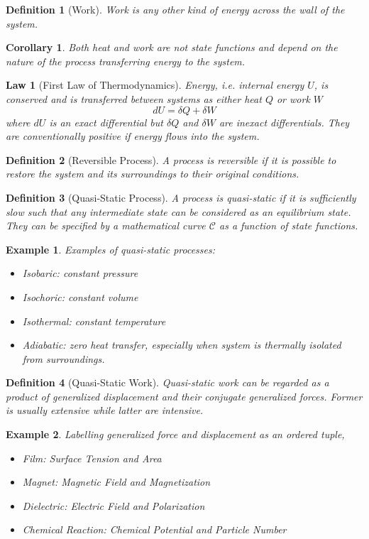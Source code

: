 \documentclass[a4paper]{article}
\newtheorem{defi}{Definition}[section]
\newtheorem{law}{Law}[section]
\newtheorem{eg}{Example}[section]
\newtheorem{cor}{Corollary}[section]
\theoremstyle{new}
\begin{document}
\begin{defi}[Work]
Work is any other kind of energy across the wall of the system.
\end{defi}
\begin{cor}
Both heat and work are not state functions and depend on the nature of the process transferring energy to the system.
\end{cor}
\begin{law}[First Law of Thermodynamics]
Energy, i.e. internal energy $U$, is conserved and is transferred between systems as either heat $Q$ or work $W$
$$dU=\delta Q+\delta W$$
where $dU$ is an exact differential but $\delta Q$ and $\delta W$ are inexact differentials. They are conventionally positive if energy flows into the system.
\end{law}
\begin{defi}[Reversible Process]
A process is reversible if it is possible to restore the system and its surroundings to their original conditions.
\end{defi}
\begin{defi}[Quasi-Static Process]
A process is quasi-static if it is sufficiently slow such that any intermediate state can be considered as an equilibrium state. They can be specified by a mathematical curve $\mathcal{C}$ as a function of state functions.
\end{defi}
\begin{eg}
Examples of quasi-static processes:
\begin{itemize}
    \item Isobaric: constant pressure
    \item Isochoric: constant volume
    \item Isothermal: constant temperature
    \item Adiabatic: zero heat transfer, especially when system is thermally isolated from surroundings.
\end{itemize}
\end{eg}
\begin{defi}[Quasi-Static Work]
Quasi-static work can be regarded as a product of generalized displacement and their conjugate generalized forces. Former is usually extensive while latter are intensive.
\end{defi}
\begin{eg}
Labelling generalized force and displacement as an ordered tuple, 
\begin{itemize}
    \item Film: Surface Tension and Area
    \item Magnet: Magnetic Field and Magnetization
    \item Dielectric: Electric Field and Polarization
    \item Chemical Reaction: Chemical Potential and Particle Number
\end{itemize}
\end{eg}
\end{document}
